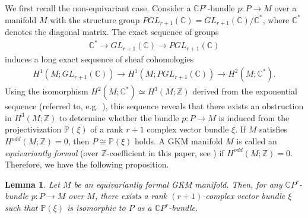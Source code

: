 \documentclass[12pt]{amsart}
\newtheorem{lemma}[theorem]{Lemma}
\theoremstyle{definition}
\theoremstyle{remark}
\numberwithin{equation}{section}
\newcommand{\C}{{\mathbb{C}}}
\renewcommand{\P}{{\mathbb{P}}}
\begin{document}
We first recall the non-equivariant case.
Consider a $\C P^r$-bundle $p\colon P\to M$ over a manifold $M$ with the structure group $PGL_{r+1}(\mathbb{C})=GL_{r+1}(\mathbb{C})/\mathbb{C}^{*}$, where $\mathbb{C}^{*}$ denotes the diagonal matrix.
The exact sequence of groups
\begin{align*}
\mathbb{C}^{*}\to GL_{r+1}(\mathbb{C})\to PGL_{r+1}(\mathbb{C})
\end{align*}
induces a long exact sequence of sheaf cohomologies
\begin{align*}
H^{1}(M;GL_{r+1}(\mathbb{C}))\to H^{1}(M;PGL_{r+1}(\mathbb{C}))\to H^{2}(M;\mathbb{C}^{*}).
\end{align*}
Using the isomorphism $H^{2}(M;\mathbb{C}^{*})\simeq H^{3}(M;\mathbb{Z})$ derived from the exponential sequence (referred to, e.g.~\cite{GH}),
this sequence reveals that there exists an obstruction in $H^{3}(M;\mathbb{Z})$ to determine whether the bundle $p\colon P\to M$ is induced from the projectivization $\P(\xi)$ of a rank $r+1$ complex vector bundle $\xi$.
If $M$ satisfies $H^{odd}(M;\mathbb{Z})=0$, then $P\cong \P(\xi)$ holds.
A GKM manifold $M$ is called an {\it equivariantly formal} (over $\mathbb{Z}$-coefficient in this paper, see \cite{GKM,FP}) if $H^{odd}(M;\mathbb{Z})=0$.
Therefore, we have the following proposition.
\begin{lemma}
\label{non-equivariant}
Let $M$ be an equivariantly formal GKM manifold.
Then, for any $\C P^r$-bundle $p\colon P\to M$ over $M$, there exists a rank $(r+1)$-complex vector bundle $\xi$ such that $\P(\xi)$ is isomorphic to $P$ as a $\mathbb{C}P^{r}$-bundle.
\end{lemma}
\end{document}
